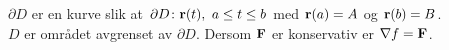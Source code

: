 \begin{frame}
  \centerline{%
  }
  $\partial D$ er en kurve slik at $\partial D \colon \mathbf{r}(t), \ a \leq t \leq b$
  med $\mathbf{r}(a)=A$ og $\mathbf{r}(b) = B$. \\
  $D$ er området avgrenset av $\partial D$. Dersom $\mathbf{F}$ er konservativ er $\nabla f = \mathbf{F}$.
\end{frame}

